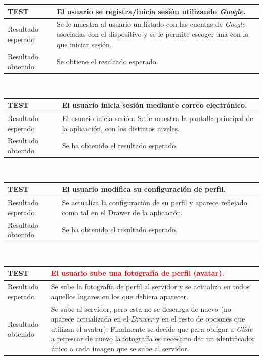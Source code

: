 \documentclass[twoside]{report}
\newcommand\addrow[2]{#1 &#2\\ }
\newcommand\addheading[2]{#1 &#2\\ \hline}
\newcommand\tabularhead{\begin{tabular}{lp{0.7\textwidth}}
\hline
}
\newenvironment{test}{\tabularhead}
{\hline\end{tabular}}
\begin{document}
\vspace{0.5cm}

\begin{test}
  \addheading{\textbf{TEST\arabic{test}}}{El usuario se registra/inicia sesión utilizando \textit{Google}.}
  \addrow{Resultado esperado}{Se le muestra al usuario un listado con las cuentas de \textit{Google} asociadas con el dispositivo y se le permite escoger una con la que iniciar sesión.}
   \addrow{Resultado obtenido}{Se obtiene el resultado esperado.}
\end{test}\\

\vspace{0.5cm}

\begin{test}
  \addheading{\textbf{TEST\arabic{test}}}{El usuario inicia sesión mediante correo electrónico.} 
  \addrow{Resultado esperado}{El usuario inicia sesión. Se le muestra la pantalla principal de la aplicación, con los distintos niveles.}
  \addrow{Resultado obtenido}{Se ha obtenido el resultado esperado.}
\end{test}\\

\vspace{0.5cm}

\begin{test}
  \addheading{\textbf{TEST\arabic{test}}}{El usuario modifica su configuración de perfil.} 
  \addrow{Resultado esperado}{Se actualiza la configuración de su perfil y aparece reflejado como tal en el Drawer de la aplicación.}
  \addrow{Resultado obtenido}{Se ha obtenido el resultado esperado.}
\end{test}\\

\vspace{0.5cm}

\begin{test}
  \addheading{\textbf{TEST\arabic{test}}}{\textcolor{red}{El usuario sube una fotografía de perfil (avatar).}} 
  \addrow{Resultado esperado}{Se sube la fotografía de perfil al servidor y se actualiza en todos aquellos lugares en los que debiera aparecer.}
  \addrow{Resultado obtenido}{Se sube al servidor, pero esta no se descarga de nuevo (no aparece actualizada en el \textit{Drawer} y en el resto de opciones que utilizan el avatar). Finalmente se decide que para obligar a \textit{Glide} a refrescar de nuevo la fotografía es necesario dar un identificador único a cada imagen que se sube al servidor.}
\end{test}\\
\end{document}
